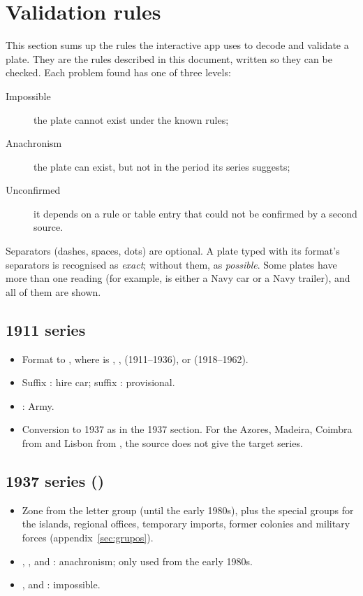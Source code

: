 \section{Validation rules}\label{sec:regras}

This section sums up the rules the interactive app uses to decode and validate a
plate. They are the rules described in this document, written so they can be
checked. Each problem found has one of three levels:

\begin{description}
  \item[Impossible] the plate cannot exist under the known rules;
  \item[Anachronism] the plate can exist, but not in the period its series suggests;
  \item[Unconfirmed] it depends on a rule or table entry that could not be
        confirmed by a second source.
\end{description}

Separators (dashes, spaces, dots) are optional. A plate typed with its format's
separators is recognised as \emph{exact}; without them, as \emph{possible}. Some
plates have more than one reading (for example,  is either a Navy
car or a Navy trailer), and all of them are shown.

\subsection{1911 series}
\begin{itemize}
  \item Format  to , where  is ,
        ,  (1911–1936),  or  (1918–1962).
  \item Suffix : hire car; suffix : provisional.
  \item {}: Army.
  \item Conversion to 1937 as in the 1937 section. For the Azores, Madeira, Coimbra
        from  and Lisbon from , the source does not
        give the target series.
\end{itemize}

\subsection{1937 series ()}
\begin{itemize}
  \item Zone from the letter group (until the early 1980s), plus the special groups
        for the islands, regional offices, temporary imports, former colonies and
        military forces (appendix~\ref{sec:grupos}).
  \item {}, ,  and : anachronism; only used
        from the early 1980s.
  \item {},  and : impossible.
\end{itemize}

